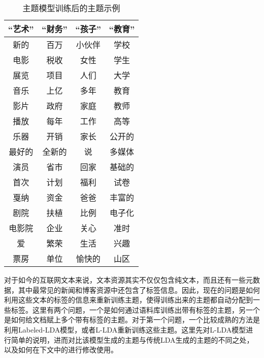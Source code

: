 \begin{table}
\caption{主题模型训练后的主题示例}
\centering
\begin{tabular}{cccc} 
\hline
“艺术” & “财务” & “孩子” & “教育” \\
\hline
新的 & 百万 & 小伙伴 & 学校\\
电影 & 税收 & 女性 & 学生\\
展览 & 项目 & 人们 & 大学\\
音乐 & 上亿 & 多年 & 教育\\
影片 & 政府 & 家庭 & 教师\\
播放 & 每年 & 工作 & 高等\\
乐器 & 开销 & 家长 & 公开的\\
最好的 & 全新的 & 说 & 多媒体\\
演员 & 省市 & 回家 & 基础的\\
首次 & 计划 & 福利 & 试卷\\
戛纳 & 资金 & 爸爸 & 丰富的\\
剧院 & 扶植 & 比例 & 电子化\\
电影院 & 企业 & 关心 & 准时\\
爱 & 繁荣 & 生活 & 兴趣\\
票房 & 单位 & 愉快的 & 山区\\
\hline
\end{tabular}
\label{tbl:topics}
\end{table}

对于如今的互联网文本来说，文本资源其实不仅仅包含纯文本，而且还有一些元数据，其中最常见的新闻和博客资源中还包含了标签信息。因此，现在的问题是如何利用这些文本的标签的信息来重新训练主题，使得训练出来的主题都自动分配到一些标签。这里有两个问题，一个是如何通过语料库训练出带有标签的主题，另一个是如何给文档赋上多个带有标签的主题。对于第一个问题，一个比较成熟的方法是利用Labeled-LDA模型，或者L-LDA\cite{ramage2009labeled}重新训练这些主题。这里先对L-LDA模型进行简单的说明，进而对比该模型生成的主题与传统LDA生成的主题的不同之处，以及如何在下文中的进行修改使用。

